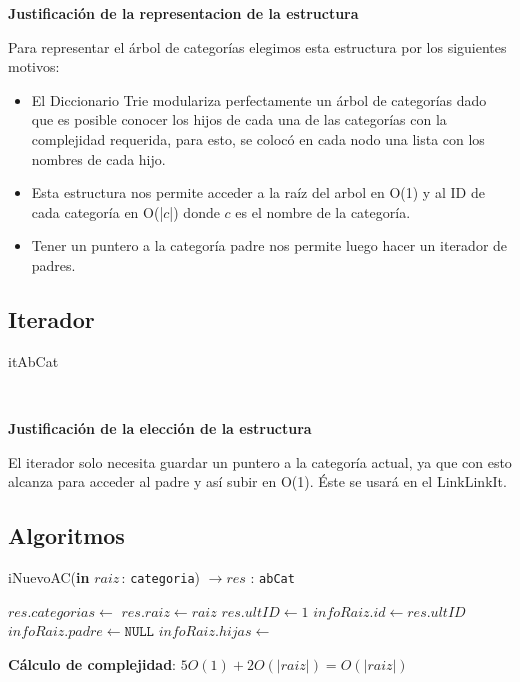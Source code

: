 \documentclass[10pt, a4paper]{article}
\let\TipoVariable=\texttt
\let\ModificadorArgumento=\textbf
\newcommand{\In}[2]{\ModificadorArgumento{in} \ensuremath{#1}\,: \TipoVariable{#2}\xspace}
\newcommand{\modTitulo}[1]{
  \vspace*{1ex}\par\noindent\textbf{\large #1}\par
}
\newcommand{\DRef}{\ensuremath{\rightarrow}}
\begin{document}
\modTitulo{Justificaci\'on de la representacion de la estructura}
Para representar el \'arbol de categor\'ias elegimos esta estructura por los siguientes motivos:
\begin{itemize}
	\item El Diccionario Trie modulariza perfectamente un \'arbol de categor\'ias dado que es posible conocer los hijos de cada una de las categor\'ias con la complejidad requerida, para esto, se coloc\'o en cada nodo una lista con los nombres de cada hijo. 
	\item Esta estructura nos permite acceder a la ra\'iz del arbol en O(1) y al ID de cada categor\'ia en O(|$c$|) donde $c$ es el nombre de la categor\'ia.
	\item Tener un puntero a la categor\'ia padre nos permite luego hacer un iterador de padres.
\end{itemize}

\subsection{Iterador}

	\begin{Estructura}{itAbCat}
	    \begin{Tupla}
	    \end{Tupla}
	\end{Estructura}

\mbox{}

~
~
\modTitulo{Justificaci\'on de la elecci\'on de la estructura}
\par El iterador solo necesita guardar un puntero a la categor\'ia actual, ya que con esto alcanza para acceder al padre y as\'i subir en O(1). \'Este se usar\'a en el LinkLinkIt.


\subsection{Algoritmos}

\begin{algorithm}[H]
\caption*{iNuevoAC(\In{raiz}{categoria}) $\DRef res$ : \TipoVariable{abCat}}
\begin{algorithmic}[1]
	\State $res.categorias \gets$ 
	\State $res.raiz \gets raiz$
	\State $res.ultID \gets 1$
	\Statex
	\State $infoRaiz.id \gets res.ultID$
	\State $infoRaiz.padre \gets \TipoVariable{NULL}$
	\State $infoRaiz.hijas \gets$ 
	\State {}
\end{algorithmic}
\textbf{C\'alculo de complejidad}: $5O(1) + 2O(|raiz|) = O(|raiz|)$
\end{algorithm}
\end{document}
